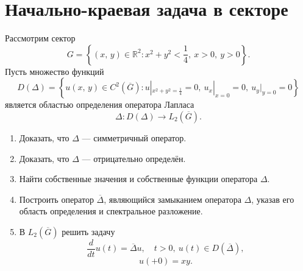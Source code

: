 \documentclass[a4paper]{article}
\begin{document}
\section{Начально-краевая задача в секторе}
\begin{hiProb}[№2]
Рассмотрим сектор
\[
	G = \left\{ (x,\,y) \in \mathbb{R}^2\colon 
	x^2+y^2<\frac{1}{4},\ x>0,\ y>0\right\} 
.\] 
Пусть множество функций
\[
	D(\Delta)= \left\{ u(x,\,y) \in  C^2\left( \overline{G} \right) \colon u|_{x^2+y^2=\frac{1}{4}}=0,\ u_x|_{x=0}=0,\
	u_y|_{y=0}=0\right\} 
\]
является областью определения оператора Лапласа
\[
	\Delta\colon D(\Delta)\to L_2 \left( \overline{G} \right) 
.\] 
\begin{enumerate}
\item Доказать, что $\Delta$ --- симметричный оператор.
	\item Доказать, что $\Delta$ --- отрицательно  определён.
	\item Найти собственные значения и собственные функции
		оператора $\Delta$.
	\item Построить оператор $\overline{\Delta}$, являющийся
		замыканием оператора $\Delta$, указав его
		область определения и спектральное разложение.
	\item В $L_2 \left( \overline{G} \right) $ решить
		задачу
		\[
			\frac{d}{dt}u(t)=\overline{\Delta}u,\quad
			t>0,\ u(t) \in D(\overline{\Delta}),
		\]
		\[
			u(+0)=xy
		.\] 
\end{enumerate}
\end{hiProb}
\end{document}
